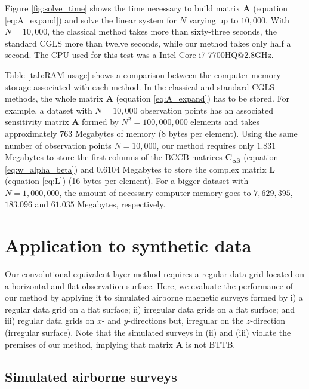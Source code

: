 \documentclass[manuscript,noblind]{geophysics}
\begin{document}
Figure \ref{fig:solve_time} shows the time necessary to build matrix $\mathbf{A}$ 
(equation \ref{eq:A_expand}) and solve the linear system for $N$ varying up to $10,000$. 
With $N = 10,000$, the classical method takes more than sixty-three seconds, the standard 
CGLS more than twelve seconds, while our method takes only half a second. 
The CPU used for this test was a Intel Core i7-7700HQ@2.8GHz.

Table \ref{tab:RAM-usage} shows a comparison between the computer memory storage 
associated with each method. In the classical and standard CGLS methods, the whole 
matrix $\mathbf{A}$ (equation \ref{eq:A_expand}) has to be stored. For example, a dataset with 
$N = 10,000$ observation points has an associated sensitivity matrix $\mathbf{A}$ formed by 
$N^2 = 100,000,000$ elements and takes approximately $763$ Megabytes of memory (8 bytes per element). 
Using the same number of observation points $N = 10,000$, our method requires only 
$1.831$ Megabytes to store the first columns of the BCCB matrices
$\mathbf{C}_{\boldsymbol{\alpha\beta}}$ (equation \ref{eq:w_alpha_beta}) and 
$0.6104$ Megabytes to store the complex matrix $\mathbf{L}$ (equation \ref{eq:L}) 
(16 bytes per element). For a bigger dataset with $N = 1,000,000$, the amount of necessary computer memory 
goes to $7,629,395$, $183.096$ and $61.035$ Megabytes, respectively.

\section{Application to synthetic data}

Our convolutional equivalent layer method requires a regular data grid located on a 
horizontal and flat observation surface.
Here, we evaluate the performance of our method by applying it to simulated airborne magnetic 
surveys formed by
i) a regular data grid on a flat surface;
ii) irregular data grids on a flat surface; and 
iii) regular data grids on $x$- and $y$-directions but, irregular on the $z$-direction (irregular surface).
Note that the simulated surveys in (ii) and (iii) violate the premises of our method, implying that matrix $\mathbf{A}$ is not BTTB.

\subsection*{Simulated airborne surveys}
\end{document}
